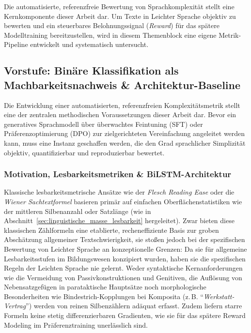 Die automatisierte, referenzfreie Bewertung von Sprachkomplexität stellt eine Kernkomponente dieser Arbeit dar. Um Texte in Leichter Sprache objektiv zu bewerten und ein steuerbares Belohnungssignal (\textit{Reward}) für das spätere Modelltraining bereitzustellen, wird in diesem Themenblock eine eigene Metrik-Pipeline entwickelt und systematisch untersucht.

\subsection{Vorstufe: Binäre Klassifikation als Machbarkeitsnachweis \& Architektur-Baseline}
\label{sec:klassifikationsmodelle}

Die Entwicklung einer automatisierten, referenzfreien Komplexitätsmetrik stellt eine der zentralen methodischen Voraussetzungen dieser Arbeit dar. Bevor ein generatives Sprachmodell über überwachtes Feintuning (SFT) oder Präferenzoptimierung (DPO) zur zielgerichteten Vereinfachung angeleitet werden kann, muss eine Instanz geschaffen werden, die den Grad sprachlicher Simplizität objektiv, quantifizierbar und reproduzierbar bewertet.

\subsubsection{Motivation, Lesbarkeitsmetriken \& BiLSTM-Architektur}
\label{sec:klassifikation_motivation}

Klassische lesbarkeitsmetrische Ansätze wie der \textit{Flesch Reading Ease} \citep{amstad1978verstaendlich} oder die \textit{Wiener Sachtextformel} \citep{bamberger1984lesen} basieren primär auf einfachen Oberflächenstatistiken wie der mittleren Silbenanzahl oder Satzlänge (wie in Abschnitt~\ref{sec:linguistische_masse_lesbarkeit} hergeleitet). Zwar bieten diese klassischen Zählformeln eine etablierte, recheneffiziente Basis zur groben Abschätzung allgemeiner Textschwierigkeit, sie stoßen jedoch bei der spezifischen Bewertung von Leichter Sprache an konzeptionelle Grenzen: Da sie für allgemeine Lesbarkeitsstufen im Bildungswesen konzipiert wurden, haben sie die spezifischen Regeln der Leichten Sprache nie gelernt. Weder syntaktische Kernanforderungen wie die Vermeidung von Passivkonstruktionen und Genitiven, die Auflösung von Nebensatzgefügen in parataktische Hauptsätze noch morphologische Besonderheiten wie Bindestrich-Kopplungen bei Komposita (z.\,B. \enquote{\textit{Werkstatt-Vertrag}}) werden von reinen Silbenzählern adäquat erfasst. Zudem liefern starre Formeln keine stetig differenzierbaren Gradienten, wie sie für das spätere Reward Modeling im Präferenztraining unerlässlich sind.

